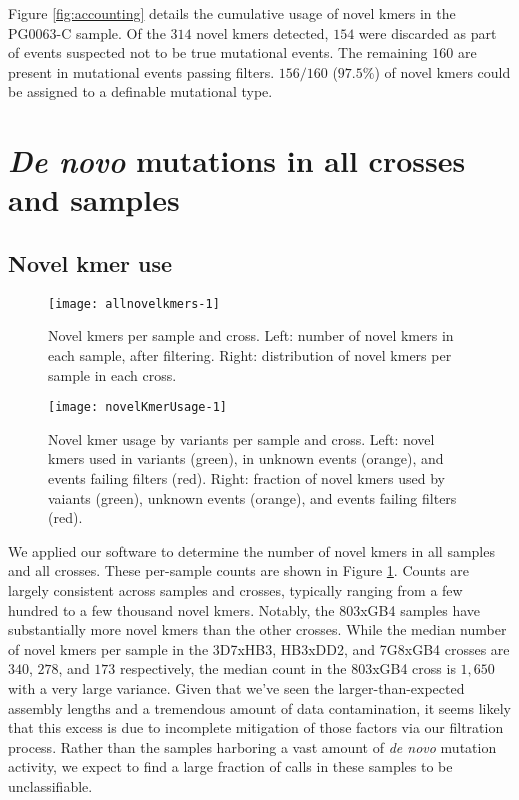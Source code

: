 Figure \ref{fig:accounting} details the cumulative usage of novel kmers in the PG0063-C sample.  Of the $314$ novel kmers detected, $154$ were discarded as part of events suspected not to be true mutational events.  The remaining $160$ are present in mutational events passing filters.  $156/160$ ($97.5\%$) of novel kmers could be assigned to a definable mutational type.

\section{\textit{De novo} mutations in all crosses and samples}

\subsection{Novel kmer use}

\begin{figure}[h!]
  \centering
    \texttt{[image: allnovelkmers-1]}
  \caption{Novel kmers per sample and cross.  Left: number of novel kmers in each sample, after filtering.  Right: distribution of novel kmers per sample in each cross.}
  \label{fig:allnovelkmers-1}
\end{figure}

\begin{figure}[h!]
  \centering
    \texttt{[image: novelKmerUsage-1]}
  \caption{Novel kmer usage by variants per sample and cross.  Left: novel kmers used in variants (green), in unknown events (orange), and events failing filters (red).  Right: fraction of novel kmers used by vaiants (green), unknown events (orange), and events failing filters (red).}
  \label{fig:novelKmerUsage-1}
\end{figure}

We applied our software to determine the number of novel kmers in all samples and all crosses.  These per-sample counts are shown in Figure \ref{fig:allnovelkmers-1}.  Counts are largely consistent across samples and crosses, typically ranging from a few hundred to a few thousand novel kmers.  Notably, the 803xGB4 samples have substantially more novel kmers than the other crosses.  While the median number of novel kmers per sample in the 3D7xHB3, HB3xDD2, and 7G8xGB4 crosses are $340$, $278$, and $173$ respectively, the median count in the 803xGB4 cross is $1,650$ with a very large variance.  Given that we've seen the larger-than-expected assembly lengths and a tremendous amount of data contamination, it seems likely that this excess is due to incomplete mitigation of those factors via our filtration process.  Rather than the samples harboring a vast amount of \textit{de novo} mutation activity, we expect to find a large fraction of calls in these samples to be unclassifiable.

